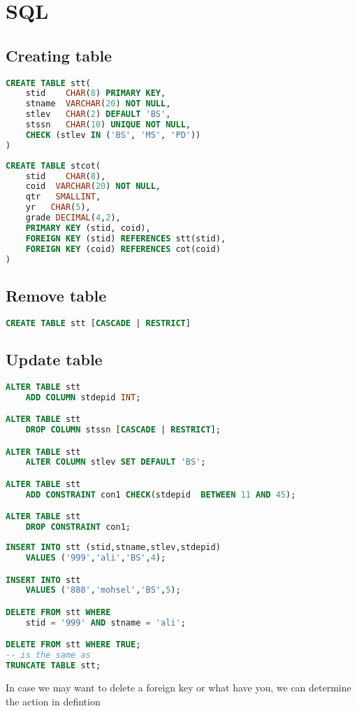 \chapter{SQL}
\section{Creating table}
\begin{lstlisting}[language=sql]
CREATE TABLE stt(
    stid    CHAR(8) PRIMARY KEY,
    stname  VARCHAR(20) NOT NULL,
    stlev   CHAR(2) DEFAULT 'BS',
    stssn   CHAR(10) UNIQUE NOT NULL,
    CHECK (stlev IN ('BS', 'MS', 'PD'))
)
\end{lstlisting}
\begin{lstlisting}[language=sql]
CREATE TABLE stcot(
    stid    CHAR(8),
    coid  VARCHAR(20) NOT NULL,
    qtr   SMALLINT,
    yr   CHAR(5),
    grade DECIMAL(4,2),
    PRIMARY KEY (stid, coid),
    FOREIGN KEY (stid) REFERENCES stt(stid),
    FOREIGN KEY (coid) REFERENCES cot(coid)
)
\end{lstlisting}

\section{Remove table}
\begin{lstlisting}[language=sql]
CREATE TABLE stt [CASCADE | RESTRICT]
\end{lstlisting}

\section{Update table}
\begin{lstlisting}[language=sql]
ALTER TABLE stt 
    ADD COLUMN stdepid INT;

ALTER TABLE stt
    DROP COLUMN stssn [CASCADE | RESTRICT];

ALTER TABLE stt
    ALTER COLUMN stlev SET DEFAULT 'BS';

ALTER TABLE stt
    ADD CONSTRAINT con1 CHECK(stdepid  BETWEEN 11 AND 45);

ALTER TABLE stt
	DROP CONSTRAINT con1;
\end{lstlisting}
\begin{lstlisting}[language=sql]
INSERT INTO stt (stid,stname,stlev,stdepid)
    VALUES ('999','ali','BS',4);

INSERT INTO stt 
    VALUES ('888','mohsel','BS',5);

DELETE FROM stt WHERE
    stid = '999' AND stname = 'ali';

DELETE FROM stt WHERE TRUE;
-- is the same as
TRUNCATE TABLE stt;

\end{lstlisting}
In case we may want to delete a foreign key or what have you, we can determine the action in defintion 

